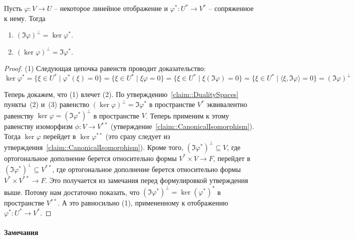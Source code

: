 \begin{claim}
\label{claim::Fredholm}
Пусть $\varphi\colon V\to U$ -- некоторое линейное отображение и $\varphi^*\colon U^*\to V^*$ -- сопряженное к нему.
Тогда
\begin{enumerate}
\item $(\Im \varphi)^\bot = \ker \varphi^*$.

\item $(\ker \varphi)^\bot = \Im \varphi^*$.
\end{enumerate}
\end{claim}
\begin{proof}
(1) Следующая цепочка равенств проводит доказательство:
\[
\ker\varphi^* =\{\xi \in U^*\mid \varphi^*(\xi) = 0\} = \{\xi \in U^*\mid \xi \varphi = 0\} = \{\xi\in U^*\mid \xi(\Im \varphi) = 0\} = \{\xi\in U^*\mid \langle \xi, \Im\varphi\rangle = 0\} = (\Im \varphi)^\bot
\]


Теперь докажем, что (1) влечет (2).
По утверждению~\ref{claim::DualitySpaces} пункты~(2) и~(3) равенство $(\ker \varphi)^\bot = \Im \varphi^*$ в пространстве $V^*$  эквивалентно равенству $\ker \varphi = (\Im \varphi^*)^\bot$ в пространстве $V$.
Теперь применим к этому равенству изоморфизм $\phi\colon V\to V^{**}$ (утверждение~\ref{claim::CanonicalIsomorphism}).
Тогда $\ker \varphi$ перейдет в $\ker \varphi^{**}$ (это сразу следует из утверждения~\ref{claim::CanonicalIsomorphism}).
Кроме того, $(\Im \varphi^*)^\bot \subseteq V$, где ортогональное дополнение берется относительно формы $V^*\times V\to F$, перейдет в $(\Im \varphi^*)^\bot\subseteq V^{**}$, где ортогональное дополнение берется относительно формы $V^*\times V^{**}\to F$.
Это получается из замечания перед формулировкой утверждения выше.
Потому нам достаточно показать, что $(\Im \varphi^*)^\bot = \ker(\varphi^*)^*$ в пространстве $V^{**}$.
А это равносильно (1), примененному к отображению $\varphi^*\colon U^*\to V^*$.
\end{proof}

\paragraph{Замечания}


